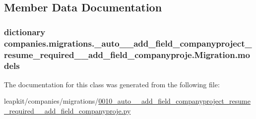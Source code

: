 \subsection{Member Data Documentation}
\hypertarget{classcompanies_1_1migrations_1_10010__auto____add__field__companyproject__resume__required____ad54079406128046e412e93b8ceaae2c1d_a265e778cd635bc099fd9663f36e05041}{
\subsubsection[{models}]{\setlength{\rightskip}{0pt plus 5cm}dictionary companies.\-migrations.\-\_\-auto\-\_\-\-\_\-add\-\_\-field\-\_\-companyproject\-\_\-resume\-\_\-required\-\_\-\-\_\-add\-\_\-field\-\_\-companyproje.\-Migration.\-models\hspace{0.3cm}{\ttfamily [static]}}}\label{classcompanies_1_1migrations_1_10010__auto____add__field__companyproject__resume__required____ad54079406128046e412e93b8ceaae2c1d_a265e778cd635bc099fd9663f36e05041}


The documentation for this class was generated from the following file\-:\begin{DoxyCompactItemize}
\item 
leapkit/companies/migrations/\hyperlink{0010__auto____add__field__companyproject__resume__required____add__field__companyproje_8py}{0010\-\_\-auto\-\_\-\-\_\-add\-\_\-field\-\_\-companyproject\-\_\-resume\-\_\-required\-\_\-\-\_\-add\-\_\-field\-\_\-companyproje.\-py}\end{DoxyCompactItemize}

